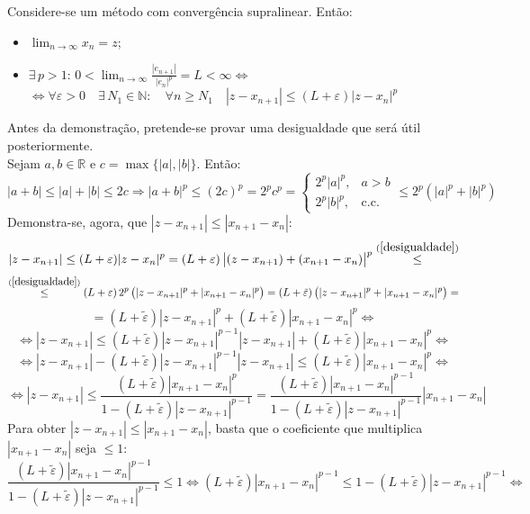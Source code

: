Considere-se um método com convergência supralinear. Então:
\begin{itemize}
    \item \( \displaystyle \lim_{n \to \infty} x_n = z \);
    \item \( \displaystyle \exists \, p > 1: \, 0 < \lim_{n \to \infty} \frac{|e_{n+1}|}{|e_n|^p} = L < \infty \Leftrightarrow \) \\
          \( \Leftrightarrow \forall \varepsilon > 0 \quad \exists \, N_1 \in \mathbb{N}: \quad \forall n \geq N_1 \quad |z - x_{n+1}| \leq (L + \varepsilon) |z - x_n|^p\)
\end{itemize}
Antes da demonstração, pretende-se provar uma desigualdade que será útil posteriormente. \\
Sejam \(a, b \in \mathbb{R}\) e \(c = \max\{|a|, |b|\}\). Então:
\begin{equation}
    |a + b| \leq |a| + |b| \leq 2c \Rightarrow |a + b|^p \leq (2c)^p = 2^p c^p =
    \begin{cases} 
        2^p |a|^p, & a > b \\
        2^p |b|^p, & \text{c.c.}
    \end{cases}
    \leq 2^p (|a|^p + |b|^p)
\label{desigualdade}
\end{equation}
Demonstra-se, agora, que \(|z - x_{n+1}| \leq |x_{n+1} - x_n|\):
\[ |z - x_{n+1}|
\leq (L + \varepsilon) |z - x_n|^p
= (L + \varepsilon) \, \big|(z - x_{n+1}) + (x_{n+1} - x_n)\big|^p \overset{(\ref{desigualdade})}{\leq} \]
\[ \overset{(\ref{desigualdade})}{\leq} (L + \varepsilon) \, 2^p \, \big( |z - x_{n+1}|^p + |x_{n+1} - x_n|^p \big)
= (L + \tilde{\varepsilon}) \, \big( |z - x_{n+1}|^p + |x_{n+1} - x_n|^p \big) = \]
\[ = (L + \tilde{\varepsilon}) |z - x_{n+1}|^p + (L + \tilde{\varepsilon}) |x_{n+1} - x_n|^p \Leftrightarrow \]
\[ \Leftrightarrow |z - x_{n+1}| \leq (L + \tilde{\varepsilon}) |z - x_{n+1}|^{p-1} |z - x_{n+1}| + (L + \tilde{\varepsilon}) |x_{n+1} - x_n|^p \Leftrightarrow \]
\[ \Leftrightarrow |z - x_{n+1}| - (L + \tilde{\varepsilon}) |z - x_{n+1}|^{p-1} |z - x_{n+1}| \leq (L + \tilde{\varepsilon}) |x_{n+1} - x_n|^p \Leftrightarrow \]
\[ \Leftrightarrow |z - x_{n+1}| \leq \frac{(L + \tilde{\varepsilon}) |x_{n+1} - x_n|^p}{1 - (L + \tilde{\varepsilon}) |z - x_{n+1}|^{p-1}}
= \frac{(L + \tilde{\varepsilon}) |x_{n+1} - x_n|^{p-1}}{1 - (L + \tilde{\varepsilon}) |z - x_{n+1}|^{p-1}} |x_{n+1} - x_n|\]
Para obter \(|z - x_{n+1}| \leq |x_{n+1} - x_n|\), basta que o coeficiente que multiplica \(|x_{n+1} - x_n|\) seja \(\leq 1\):
\[ \frac{(L + \tilde{\varepsilon}) |x_{n+1} - x_n|^{p-1}}{1 - (L + \tilde{\varepsilon}) |z - x_{n+1}|^{p-1}} \leq 1 \Leftrightarrow
(L + \tilde{\varepsilon}) |x_{n+1} - x_n|^{p-1} \leq 1 - (L + \tilde{\varepsilon}) |z - x_{n+1}|^{p-1} \Leftrightarrow \]

